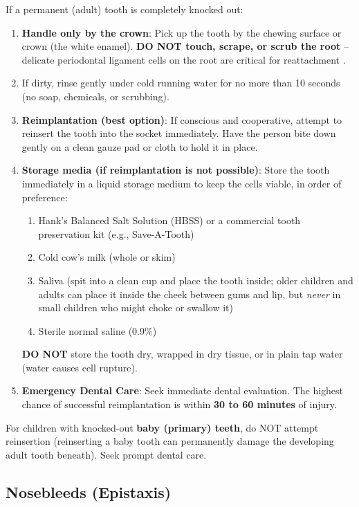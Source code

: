 If a permanent (adult) tooth is completely knocked out:
\begin{enumerate}[leftmargin=*]
  \item \textbf{Handle only by the crown}: Pick up the tooth by the chewing surface or crown (the white enamel). \textbf{DO NOT touch, scrape, or scrub the root} -- delicate periodontal ligament cells on the root are critical for reattachment \cite{aha_arc_2024}.
  \item If dirty, rinse gently under cold running water for no more than 10 seconds (no soap, chemicals, or scrubbing).
  \item \textbf{Reimplantation (best option)}: If conscious and cooperative, attempt to reinsert the tooth into the socket immediately. Have the person bite down gently on a clean gauze pad or cloth to hold it in place.
  \item \textbf{Storage media (if reimplantation is not possible)}: Store the tooth immediately in a liquid storage medium to keep the cells viable, in order of preference:
    \begin{enumerate}
      \item Hank's Balanced Salt Solution (HBSS) or a commercial tooth preservation kit (e.g., Save-A-Tooth)
      \item Cold cow's milk (whole or skim)
      \item Saliva (spit into a clean cup and place the tooth inside; older children and adults can place it inside the cheek between gums and lip, but \emph{never} in small children who might choke or swallow it)
      \item Sterile normal saline (0.9\%)
    \end{enumerate}
    \textbf{DO NOT} store the tooth dry, wrapped in dry tissue, or in plain tap water (water causes cell rupture).
  \item \textbf{Emergency Dental Care}: Seek immediate dental evaluation. The highest chance of successful reimplantation is within \textbf{30 to 60 minutes} of injury.
\end{enumerate}
For children with knocked-out \textbf{baby (primary) teeth}, do NOT attempt reinsertion (reinserting a baby tooth can permanently damage the developing adult tooth beneath). Seek prompt dental care.



\subsection{Nosebleeds (Epistaxis)}

